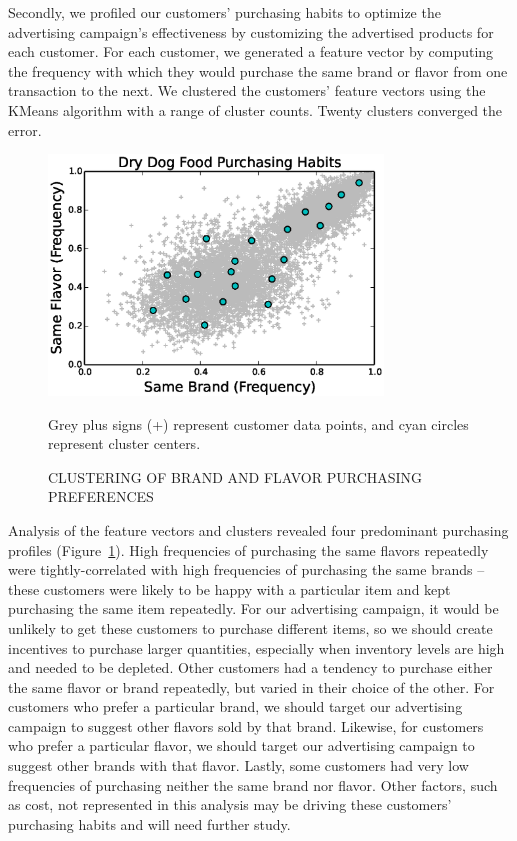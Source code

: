 Secondly, we profiled our customers' purchasing habits to optimize the advertising campaign's effectiveness by customizing the advertised products for each customer.  For each customer, we generated a feature vector by computing the frequency with which they would purchase the same brand or flavor from one transaction to the next.  We clustered the customers' feature vectors using the KMeans algorithm with a range of cluster counts. Twenty clusters converged the error.

\begin{figure}[!t]
  \centering
  \caption{\uppercase{Clustering of Brand and Flavor Purchasing Preferences}}
  \includegraphics[width=3.5in]{figures/bigpetstore/cluster_analysis.eps}

  Grey plus signs (+) represent customer data points, and cyan circles represent cluster centers.
  \label{fig:cluster_analysis}
\end{figure}

Analysis of the feature vectors and clusters revealed four predominant purchasing profiles (Figure~\ref{fig:cluster_analysis}).  High frequencies of purchasing the same flavors repeatedly were tightly-correlated with high frequencies of purchasing the same brands -- these customers were likely to be happy with a particular item and kept purchasing the same item repeatedly.  For our advertising campaign, it would be unlikely to get these customers to purchase different items, so we should create incentives to purchase larger quantities, especially when inventory levels are high and needed to be depleted.  Other customers had a tendency to purchase either the same flavor or brand repeatedly, but varied in their choice of the other.  For customers who prefer a particular brand, we should target our advertising campaign to suggest other flavors sold by that brand.  Likewise, for customers who prefer a particular flavor, we should target our advertising campaign to suggest other brands with that flavor.  Lastly, some customers had very low frequencies of purchasing neither the same brand nor flavor.  Other factors, such as cost, not represented in this analysis may be driving these customers' purchasing habits and will need further study.


